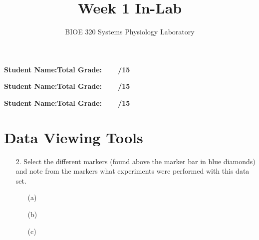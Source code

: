 \documentclass{article}
\title{Week 1 In-Lab}
\author{BIOE 320 Systems Physiology Laboratory}
\date{}
\begin{document}
\maketitle
\large

\textbf{Student Name:}\hfill 	\textbf{Total Grade:\ \ \ \ /15}\vspace{0.5cm}

\textbf{Student Name:}\hfill 	\textbf{Total Grade:\ \ \ \ /15}\vspace{0.5cm}

\textbf{Student Name:}\hfill 	\textbf{Total Grade:\ \ \ \ /15}\\

\section*{Data Viewing Tools}
\begin{itemize}
	\item[2.] Select the different markers (found above the marker bar in blue diamonds) and note from the markers what experiments were performed with this data set.
	
		\begin{itemize}
			\item[(a)]
			
			\item[(b)]\vspace{1cm}
			
			\item[(c)]\vspace{1cm}
		\end{itemize}

\end{itemize}
\end{document}
